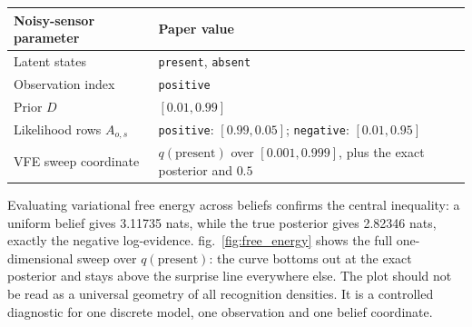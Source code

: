 \documentclass[
  english,
]{article}
\newcounter{none} %
\begin{document}
{\def\LTcaptype{none} %
\begin{longtable}[]{@{}
  >{\raggedright\arraybackslash}p{}
  >{\raggedright\arraybackslash}p{}@{}}
\toprule\noalign{}
\begin{minipage}[b]{\linewidth}\raggedright
Noisy-sensor parameter
\end{minipage} & \begin{minipage}[b]{\linewidth}\raggedright
Paper value
\end{minipage} \\
\midrule\noalign{}
\endhead
\bottomrule\noalign{}
\endlastfoot
Latent states & \texttt{present}, \texttt{absent} \\
Observation index & \texttt{positive} \\
Prior \(D\) & \([0.01, 0.99]\) \\
Likelihood rows \(A_{o,s}\) & \texttt{positive}: \([0.99, 0.05]\);
\texttt{negative}: \([0.01, 0.95]\) \\
VFE sweep coordinate & \(q(\mathrm{present})\) over \([0.001, 0.999]\),
plus the exact posterior and \(0.5\) \\
\end{longtable}
}

Evaluating variational free energy across beliefs confirms the central
inequality: a uniform belief gives 3.11735 nats, while the true
posterior gives 2.82346 nats, exactly the negative log-evidence.
fig.~\ref{fig:free_energy} shows the full one-dimensional sweep over
\(q(\mathrm{present})\): the curve bottoms out at the exact posterior
and stays above the surprise line everywhere else. The plot should not
be read as a universal geometry of all recognition densities. It is a
controlled diagnostic for one discrete model, one observation and one
belief coordinate.
\end{document}
